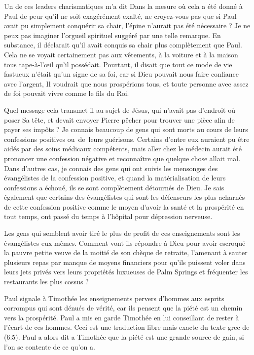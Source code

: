 Un de ces leaders charismatiques m'a dit\frcolon{}
 \Og Dans la mesure où cela a été donné à Paul de peur
 qu'il ne soit exagérément exalté, ne croyez-vous pas que si Paul
 avait pu simplement conquérir sa chair, l'épine n'aurait pas
 été nécessaire ? \Fg{}
 Je ne peux pas imaginer l'orgueil spirituel suggéré par une telle remarque.
 En substance, il déclarait qu'il avait conquis sa chair
 plus complètement que Paul. Cela ne se voyait certainement pas
 aux vêtements, à la voiture et à la maison tous tape-à-l'œil
 qu'il possédait. Pourtant, il disait que tout ce mode de vie
 fastueux n'était qu'un signe de sa foi, car si Dieu pouvait nous faire
 confiance avec l'argent, Il voudrait que nous prospérions tous,
 et toute personne avec assez de foi pouvait vivre comme le fils du Roi.

Quel message cela transmet-il au sujet de Jésus, qui n'avait pas
 d'endroit où poser Sa tête, et devait envoyer Pierre pêcher
 pour trouver une pièce afin de payer ses impôts ? Je connais beaucoup de gens
 qui sont morts au cours de leurs confessions positives ou~de~leurs guérisons.
 Certains d'entre eux auraient pu être aidés par des soins médicaux
 compétents, mais aller chez le médecin aurait été prononcer une confession négative
 et reconnaître que quelque chose allait mal.
 Dans d'autres cas, je connais des gens qui ont suivis les mensonges
 des évangélistes de la confession positive, et quand la matérialisation
 de leurs confessions a échoué, ils se sont complètement détournés de Dieu.
 Je sais également que certains des évangélistes qui sont les défenseurs
 les plus acharnés de cette confession positive comme le moyen d'avoir la santé
 et la prospérité en tout temps, ont passé du temps à l'hôpital
 pour dépression nerveuse.

Les gens qui semblent avoir tiré le plus de profit de ces enseignements
 sont les évangélistes eux-mêmes. Comment vont-ils répondre à Dieu
 pour avoir escroqué la pauvre petite veuve de la moitié de son chèque
 de retraite, l'amenant à sauter plusieurs repas par manque
 de moyens financiers pour qu'ils puissent voler dans leurs jets privés
 vers leurs propriétés luxueuses de Palm Springs et fréquenter les
 restaurants les plus cossus ?

Paul signale à Timothée les enseignements pervers
 d'hom\-mes aux esprits corrompus qui sont dénués de vérité, car ils pensent
 que la piété est un chemin vers la prospérité.
 Paul a mis en garde Timothée en lui conseillant de rester à l'écart de ces hommes.
 Ceci est une traduction libre mais exacte du texte grec
 de (6:5).
 Paul a alors dit a Timothée que la piété est une grande source de gain,
 si l'on se contente de ce qu'on a.
\closechapter

